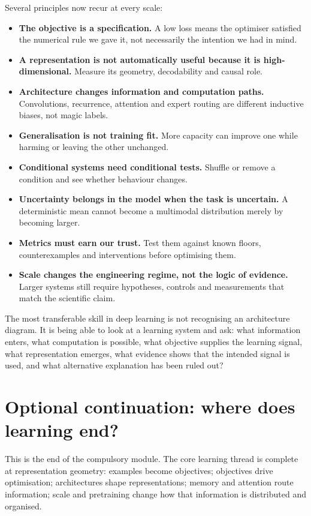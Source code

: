 Several principles now recur at every scale:
\begin{itemize}[leftmargin=*]
  \item \textbf{The objective is a specification.} A low loss means the optimiser satisfied the numerical rule we gave it, not necessarily the intention we had in mind.
  \item \textbf{A representation is not automatically useful because it is high-dimensional.} Measure its geometry, decodability and causal role.
  \item \textbf{Architecture changes information and computation paths.} Convolutions, recurrence, attention and expert routing are different inductive biases, not magic labels.
  \item \textbf{Generalisation is not training fit.} More capacity can improve one while harming or leaving the other unchanged.
  \item \textbf{Conditional systems need conditional tests.} Shuffle or remove a condition and see whether behaviour changes.
  \item \textbf{Uncertainty belongs in the model when the task is uncertain.} A deterministic mean cannot become a multimodal distribution merely by becoming larger.
  \item \textbf{Metrics must earn our trust.} Test them against known floors, counterexamples and interventions before optimising them.
  \item \textbf{Scale changes the engineering regime, not the logic of evidence.} Larger systems still require hypotheses, controls and measurements that match the scientific claim.
\end{itemize}

\begin{keyidea}
The most transferable skill in deep learning is not recognising an architecture diagram. It is being able to look at a learning system and ask: what information enters, what computation is possible, what objective supplies the learning signal, what representation emerges, what evidence shows that the intended signal is used, and what alternative explanation has been ruled out?
\end{keyidea}

\section{Optional continuation: where does learning end?}

This is the end of the compulsory module. The core learning thread is complete at representation geometry: examples become objectives; objectives drive optimisation; architectures shape representations; memory and attention route information; scale and pretraining change how that information is distributed and organised.

